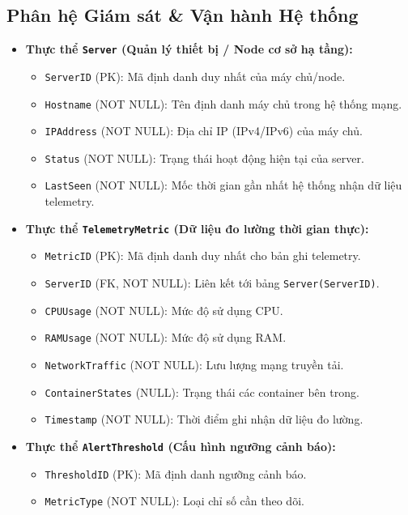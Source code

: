 \subsection{Phân hệ Giám sát \& Vận hành Hệ thống}
\begin{itemize}[leftmargin=2em]
    \item \textbf{Thực thể \texttt{Server} (Quản lý thiết bị / Node cơ sở hạ tầng):}
    \begin{itemize}
        \item \texttt{ServerID} (PK): Mã định danh duy nhất của máy chủ/node.
        \item \texttt{Hostname} (NOT NULL): Tên định danh máy chủ trong hệ thống mạng.
        \item \texttt{IPAddress} (NOT NULL): Địa chỉ IP (IPv4/IPv6) của máy chủ.
        \item \texttt{Status} (NOT NULL): Trạng thái hoạt động hiện tại của server.
        \item \texttt{LastSeen} (NOT NULL): Mốc thời gian gần nhất hệ thống nhận dữ liệu telemetry.
    \end{itemize}
    \item \textbf{Thực thể \texttt{TelemetryMetric} (Dữ liệu đo lường thời gian thực):}
    \begin{itemize}
        \item \texttt{MetricID} (PK): Mã định danh duy nhất cho bản ghi telemetry.
        \item \texttt{ServerID} (FK, NOT NULL): Liên kết tới bảng \texttt{Server(ServerID)}.
        \item \texttt{CPUUsage} (NOT NULL): Mức độ sử dụng CPU.
        \item \texttt{RAMUsage} (NOT NULL): Mức độ sử dụng RAM.
        \item \texttt{NetworkTraffic} (NOT NULL): Lưu lượng mạng truyền tải.
        \item \texttt{ContainerStates} (NULL): Trạng thái các container bên trong.
        \item \texttt{Timestamp} (NOT NULL): Thời điểm ghi nhận dữ liệu đo lường.
    \end{itemize}
    \item \textbf{Thực thể \texttt{AlertThreshold} (Cấu hình ngưỡng cảnh báo):}
    \begin{itemize}
        \item \texttt{ThresholdID} (PK): Mã định danh ngưỡng cảnh báo.
        \item \texttt{MetricType} (NOT NULL): Loại chỉ số cần theo dõi.

\end{itemize}
\end{itemize}
